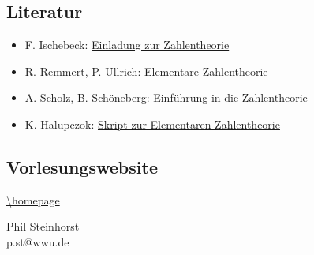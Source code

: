 \subsection*{Literatur}
\label{sub:lit}
\begin{itemize}
	\item F. Ischebeck: \href{http://wwwmath.uni-muenster.de/u/ischebeck/}{Einladung zur Zahlentheorie}
	\item R. Remmert, P. Ullrich: \href{http://link.springer.com/book/10.1007/978-3-7643-7731-1}{Elementare Zahlentheorie}
	\item A. Scholz, B. Schöneberg: Einführung in die Zahlentheorie
	\item K. Halupczok: \href{http://wwwmath.uni-muenster.de/u/karin.halupczok/ElZthSS2009Skript.pdf}{Skript zur Elementaren Zahlentheorie}
\end{itemize}

\subsection*{Vorlesungswebsite}
\label{sub:link}
\begin{center}
	\url{\homepage}
\end{center}


\vfill
\begin{flushright}
	Phil Steinhorst \\
	p.st@wwu.de
\end{flushright}
\newpage